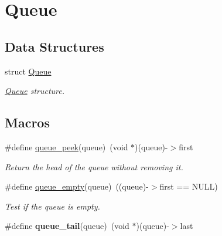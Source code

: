 \hypertarget{group__queue}{}\section{Queue}
\label{group__queue}
\subsection*{Data Structures}
\begin{DoxyCompactItemize}
\item 
struct \hyperlink{structQueue}{Queue}
\begin{DoxyCompactList}\small\item\em \hyperlink{structQueue}{Queue} structure. \end{DoxyCompactList}\end{DoxyCompactItemize}
\subsection*{Macros}
\begin{DoxyCompactItemize}
\item 
\#define \hyperlink{group__queue_gab4e9f523209630c13dec04655bfacc49}{queue\+\_\+peek}(queue)~(void $\ast$)(queue)-\/$>$first
\begin{DoxyCompactList}\small\item\em Return the head of the queue without removing it. \end{DoxyCompactList}\item 
\#define \hyperlink{group__queue_ga3001011f0b018b23ce87b33bbc6438d9}{queue\+\_\+empty}(queue)~((queue)-\/$>$first == N\+U\+LL)
\begin{DoxyCompactList}\small\item\em Test if the queue is empty. \end{DoxyCompactList}\item 
\mbox{\label{group__queue_gaf8cdbd97f880479207466745a6afe6b3}} 
\#define {\bfseries queue\+\_\+tail}(queue)~(void $\ast$)(queue)-\/$>$last
\end{DoxyCompactItemize}
